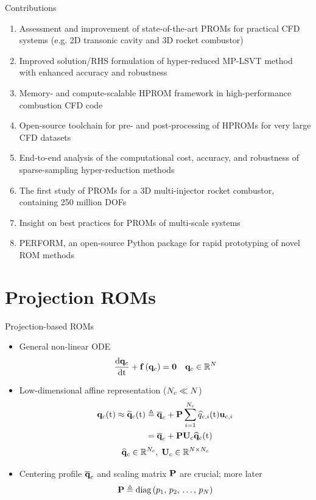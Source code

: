 \documentclass[]{beamer}
\begin{document}
\begin{frame}{Contributions}
    \begin{enumerate}
        \item Assessment and improvement of state-of-the-art PROMs for practical CFD systems (e.g. 2D transonic cavity and 3D rocket combustor)
        \item Improved solution/RHS formulation of hyper-reduced MP-LSVT method with enhanced accuracy and robustness
        \item Memory- and compute-scalable HPROM framework in high-performance combustion CFD code
        \item Open-source toolchain for pre- and post-processing of HPROMs for very large CFD datasets
        \item End-to-end analysis of the computational cost, accuracy, and robustness of sparse-sampling hyper-reduction methods
        \item The first study of PROMs for a 3D multi-injector rocket combustor, containing 250 million DOFs
        \item Insight on best practices for PROMs of multi-scale systems
        \item PERFORM, an open-source Python package for rapid prototyping of novel ROM methods
    \end{enumerate}
\end{frame}

\section*{Projection ROMs}

\begin{frame}{Projection-based ROMs}
    \begin{itemize}
		\item General non-linear ODE
		\begin{equation*}
			\frac{\text{d} \mathbf{q}_c}{\text{d} \text{t}} + \mathbf{f} \left(\mathbf{q}_c\right) = \mathbf{0} \quad \mathbf{q}_c \in \mathbb{R}^{N}
		\end{equation*}
			\item Low-dimensional affine representation ($N_c \ll N$)
		\begin{align*}
			\consVec(\timeVar) \approx \consVecRom(\timeVar) &\triangleq \consVecCent + \consScale \sum^{\numConsvModes}_{i=1} \consVarCoef(\timeVar) \consTrialVec \\
			&= \consVecCent + \consScale \consTrial \consVecCoef(\timeVar)
		\end{align*}
		\begin{equation*}
			\consVecCoef \in \mathbb{R}^{\numConsvModes}, \; \consTrial \in \mathbb{R}^{\numDOF \times \numConsvModes}
		\end{equation*}
		\item Centering profile $\mathbf{\overline{q}}_c$ and scaling matrix $\consScale$ are crucial; more later
		\begin{equation*}
			\consScale \triangleq \text{diag}\left( \consScaleVar_1, \, \consScaleVar_2, \, \hdots, \, \consScaleVar_{\numDOF} \right)
		\end{equation*}
	\end{itemize}
\end{frame}
\end{document}
